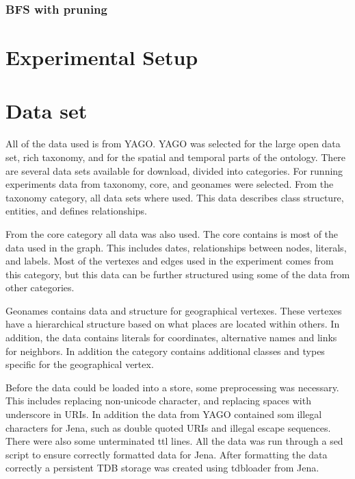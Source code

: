 \subsubsection{BFS with pruning}

\section{Experimental Setup}
\label{sec:experimentalSetup}

\section{Data set}
All of the data used is from YAGO. YAGO was selected for the large open data set, rich taxonomy, and for the spatial and temporal parts of the ontology. There are several data sets available for download, divided into categories. For running experiments data from taxonomy, core, and geonames were selected. From the taxonomy category, all data sets where used. This data describes class structure, entities, and defines relationships.

From the core category all data was also used. The core contains is most of the data used in the graph. This includes dates, relationships between nodes, literals, and labels. Most of the vertexes and edges used in the experiment comes from this category, but this data can be further structured using some of the data from other categories.

Geonames contains data and structure for geographical vertexes. These vertexes have a hierarchical structure based on what places are located within others. In addition, the data contains literals for coordinates, alternative names and links for neighbors. In addition the category contains additional classes and types specific for the geographical vertex.

Before the data could be loaded into a store, some preprocessing was necessary. This includes replacing non-unicode character, and replacing spaces with underscore in URIs. In addition the data from YAGO contained som illegal characters for Jena, such as double quoted URIs and illegal escape sequences. There were also some unterminated ttl lines. All the data was run through a sed script to ensure correctly formatted data for Jena. After formatting the data correctly a persistent TDB storage was created using tdbloader from Jena.


